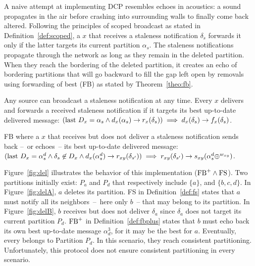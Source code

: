 A naive attempt at implementing DCP resembles echoes in acoustics: a
sound propagates in the air before crashing into surrounding walls to
finally come back altered. Following the principles of scoped
broadcast as stated in Definition~\ref{def:scoped}, a \process $x$
that receives a staleness notification $\delta_s$ forwards it only if
the latter targets its current partition $\alpha_s$. The staleness
notifications propagate through the network as long as they remain in
the deleted partition. When they reach the bordering \processes of the
deleted partition, it creates an echo of bordering partitions that
will go backward to fill the gap left open by removals using
forwarding of best (FB) as stated by Theorem~\ref{theo:fb}.



\begin{definition}
  Any source can broadcast a staleness notification at any
  time. Every \process $x$ delivers and forwards a received staleness
  notification if it targets its best up-to-date delivered message:
  $(\textup{last}~ D_x = \alpha_s \wedge d_x(\alpha_s) \rightarrow
  r_x(\delta_s)) \implies d_x(\delta_s) \rightarrow f_x(\delta_s)$.
\end{definition}

\begin{definition} FB where
  a \process $x$ that receives but does not deliver a staleness
  notification sends back --~or echoes~-- its best up-to-date
  delivered message: $(\textup{last}~ D_x = \alpha_s^d \wedge \delta_s
  \not\in D_x \wedge d_x(\alpha_s^d)\rightarrow r_{xy}(\delta_{s'}))
  \implies r_{xy}(\delta_{s'}) \rightarrow
  s_{xy}(\alpha_s^d\oplus^{w_{xy}})$.

  
\end{definition}

Figure~\ref{fig:del} illustrates the behavior of this implementation
($\textup{FB}^+ \wedge \textup{FS}$).  Two partitions initially exist:
$P_a$ and $P_d$ that respectively include $\{a\}$, and $\{b, c,
d\}$. In Figure~\ref{fig:delA}, $a$ deletes its partition. FS in
Definition~\ref{def:fs} states that $a$ must notify all its
neighbors~--~here only $b$~-- that may belong to its partition.  In
Figure~\ref{fig:delB}, $b$ receives but does not deliver $\delta_a$
since $\delta_a$ does not target its current partition $P_d$.
$\textup{FB}^+$ in Definition~\ref{def:fbplus} states that $b$ must
echo back its own best up-to-date message $\alpha_d^3$, for it may be
the best for $a$. Eventually, every \process belongs to Partition
$P_d$. In this scenario, they reach consistent
partitioning. Unfortunately, this protocol does not ensure consistent
partitioning in every scenario.

